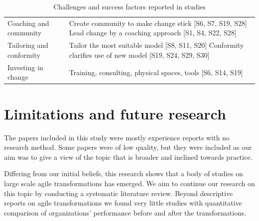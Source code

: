 \documentclass[lnbip]{svmultln}
\begin{document}
\begin{table}[t]
\begin{tabular}{ p{} p{} }
        \raggedright\rule{0pt}{0.4cm}Coaching and community  &
             Create community to make change stick [S6, S7, S19, S28] \newline
             Lead change by a coaching approach [S1, S4, S22, S28] \\
        
        \raggedright\rule{0pt}{0.4cm}Tailoring and conformity  &
            Tailor the most suitable model [S8, S11, S20] \newline
            Conformity clarifies use of new model [S19, S24, S29, S30]\\
        
        \raggedright\rule{0pt}{0.4cm}Investing in change  &
            Training, consulting, physical spaces, tools [S6, S14, S19]\\
        \bottomrule
    \end{tabular}
    \caption{Challenges and success factors reported in studies}
    \label{table:success}
\end{table}


\section{Limitations and future research}
\label{sec:conclusion}

The papers included in this study were mostly experience reports with no
research method. Some papers were of low quality, but they were included as our
aim was to give a view of the topic that is broader and inclined towards practice.

Differing from our initial beliefs, this research shows that a body of studies
on large scale agile transformations has emerged. We aim to continue our
research on this topic by conducting a systematic literature review. Beyond
descriptive reports on agile transformations we found very little studies with
quantitative comparison of organizations' performance before and after the
transformations.






\end{document}
